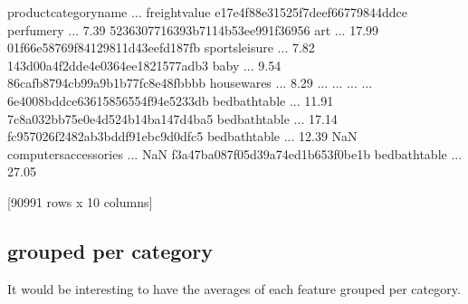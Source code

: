 \documentclass[letterpaper,10pt,english]{jupyterBook}
\begin{document}
\begin{sphinxVerbatim}[commandchars=\\\{\}]
\end{sphinxVerbatim}

\begin{sphinxVerbatim}[commandchars=\\\{\}]
                                  product\PYGZus{}category\PYGZus{}name  ...  freight\PYGZus{}value
e17e4f88e31525f7deef66779844ddce              perfumery  ...           7.39
5236307716393b7114b53ee991f36956                    art  ...          17.99
01f66e58769f84129811d43eefd187fb         sports\PYGZus{}leisure  ...           7.82
143d00a4f2dde4e0364ee1821577adb3                   baby  ...           9.54
86cafb8794cb99a9b1b77fc8e48fbbbb             housewares  ...           8.29
...                                                 ...  ...            ...
6e4008bddce63615856554f94e5233db         bed\PYGZus{}bath\PYGZus{}table  ...          11.91
7c8a032bb75e0e4d524b14ba147d4ba5         bed\PYGZus{}bath\PYGZus{}table  ...          17.14
fc957026f2482ab3bddf91ebc9d0dfc5         bed\PYGZus{}bath\PYGZus{}table  ...          12.39
NaN                               computers\PYGZus{}accessories  ...            NaN
f3a47ba087f05d39a74ed1b653f0be1b         bed\PYGZus{}bath\PYGZus{}table  ...          27.05

[90991 rows x 10 columns]
\end{sphinxVerbatim}


\subsection{grouped per category}
\label{\detokenize{c7_case_studies/Olist:grouped-per-category}}
\sphinxAtStartPar
It would be interesting to have the averages of each feature grouped per category.

\begin{sphinxVerbatim}[commandchars=\\\{\}]
  
\end{sphinxVerbatim}
\end{document}
